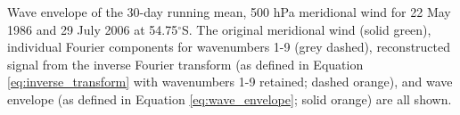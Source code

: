 \label{fig:example_hilbert}
Wave envelope of the 30-day running mean, 500 hPa meridional wind for 22 May 1986 and 29 July 2006 at 54.75$^{\circ}$S. The original meridional wind (solid green), individual Fourier components for wavenumbers 1-9 (grey dashed), reconstructed signal from the inverse Fourier transform (as defined in Equation \ref{eq:inverse_transform} with wavenumbers 1-9 retained; dashed orange), and wave envelope (as defined in Equation \ref{eq:wave_envelope}; solid orange) are all shown.